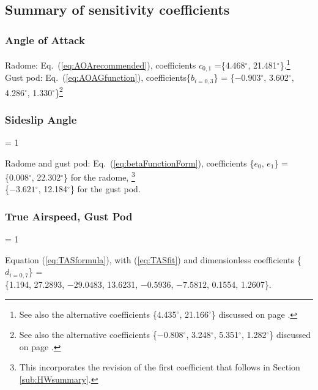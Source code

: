 \documentclass[12pt,twoside,english]{article}\usepackage[]{graphicx}\usepackage[]{color}
\makeatletter
\newlength{\lyxhang}
\newenvironment{hangparagraphs}
     {%
       \ifthenelse{\lengthtest{\parindent > 0pt}}%
         {\setlength{\lyxhang}{\parindent}}%
         {\setlength{\lyxhang}{2em}}%
       \par\begin{hangparas}{\lyxhang}{1}%
     }
     {\end{hangparas}}
\newenvironment{hangparagraphs}
     {%
       \ifthenelse{\lengthtest{\parindent > 0pt}}%
         {\setlength{\lyxhang}{\parindent}}%
         {\setlength{\lyxhang}{2em}}%
       \begin{hangparas}%
     }
     {\end{hangparas}}
\newcommand{\hangpara}{\hangindent \lyxhang \hangafter 1 \noindent}
\newenvironment{hangparas}{\setlength{\parindent}{\z@}
   \everypar={\hangpara}}{\par}
\makeatother
\begin{document}

\subsection{Summary of sensitivity coefficients\label{sub:CalSummary}}


\subsubsection{Angle of Attack}

Radome: Eq.~(\ref{eq:AOArecommended}), coefficients $c_{0,1}$ =\{4.468$^{\circ}$, 
21.481$^{\circ}$\}.\footnote{See also the alternative coefficients \{4.435$^{\circ}$, 21.166$^{\circ}$\} discussed on page \pageref{coefficients-aoa-all-flt}.}\\ Gust pod: Eq.~(\ref{eq:AOAGfunction}), coefficients\{$b_{i=0,3}$\} = \{\ensuremath{-0.903}$^{\circ}$, 3.602$^{\circ}$, 
4.286$^{\circ}$, 1.330$^{\circ}$\}\footnote{See also the alternative coefficients \{\ensuremath{-0.808}$^{\circ}$, 3.248$^{\circ}$, 5.351$^{\circ}$, 1.282$^{\circ}$\} discussed on page \pageref{aoa-coefficients-GP-all-flt}.}


\subsubsection{Sideslip Angle\label{CalSSsummary}}
\begin{hangparagraphs}
Radome and gust pod: Eq.~(\ref{eq:betaFunctionForm}), coefficients%
\{$e_{0}$, $e_{1}$\} = \\%
\qquad{} \{0.008$^{\circ}$, 22.302$^{\circ}$\} for the radome,%
\footnote{This incorporates the revision of the first coefficient that follows in Section \ref{sub:HWsummary}.}\\%
\qquad{} \{\ensuremath{-3.621}$^{\circ}$, 12.184$^{\circ}$\} for the gust pod.%
\end{hangparagraphs}

\subsubsection{True Airspeed, Gust Pod}
\begin{hangparagraphs}
Equation (\ref{eq:TASformula}), with (\ref{eq:TASfit}) and dimensionless coefficients%
\{$d_{i=0,7}$\} = \\%
\qquad{} \{1.194, 27.2893, \ensuremath{-29.0483}, 13.6231, \ensuremath{-0.5936}, \ensuremath{-7.5812}, 0.1554, 1.2607\}.%
\end{hangparagraphs}
\end{document}
